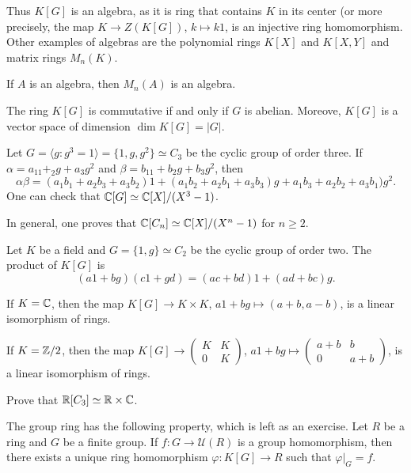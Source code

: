 Thus $K[G]$ is an algebra, as it is ring that contains $K$ in its center (or more precisely,
the map $K\to Z(K[G])$, $k\mapsto k1$, is an injective ring homomorphism.  
Other examples of algebras 
are the polynomial rings $K[X]$ and $K[X,Y]$ and matrix rings $M_n(K)$.  

\begin{example}
	If $A$ is an algebra, then $M_n(A)$ is an algebra.	
\end{example}

The ring $K[G]$ is commutative if and only if $G$ is abelian. Moreove,
$K[G]$ is a vector space of dimension $\dim K[G]=|G|$.

\begin{example}
	Let $G=\langle g:g^3=1\rangle=\{1,g,g^2\}\simeq C_3$ be the cyclic group of order three. 
	If $\alpha=a_11+_2g+a_3g^2$ and $\beta=b_11+b_2g+b_3g^2$, then
	\[
		\alpha\beta=(a_1b_1+a_2b_3+a_3b_2)1+(a_1b_2+a_2b_1+a_3b_3)g+a_1b_3+a_2b_2+a_3b_1)g^2.
	\]
	One can check that $\mathbb{C}[G]\simeq\mathbb{C}[X]/(X^3-1)$. 
\end{example}

In general, one proves that $\mathbb{C}[C_n]\simeq\mathbb{C}[X]/(X^n-1)$ for $n\geq2$.

\begin{example}
	Let $K$ be a field and 
	$G=\{1,g\}\simeq C_2$ be the cyclic group of order two. The product
	of $K[G]$ is 
	\[
	(a1+bg)(c1+gd)=(ac+bd)1+(ad+bc)g.
	\]
	
	If $K=\mathbb{C}$, then the map $K[G]\to K\times K$, $a1+bg\mapsto (a+b,a-b)$, 
	is a linear isomorphism of rings. 
	
	If $K=\mathbb{Z}/2$, then the map $K[G]\to\begin{pmatrix}
		K&K\\
		0&K
	\end{pmatrix}$, $a1+bg\mapsto\begin{pmatrix}
		a+b&b\\
		0&a+b		
	\end{pmatrix}$, is a linear isomorphism of rings. 
\end{example}

\begin{exercise}
	Prove that $\mathbb{R}[C_3]\simeq\mathbb{R}\times\mathbb{C}$. 	
\end{exercise}

The group ring has the following property, which is left as an exercise. 
Let $R$ be a ring and
$G$ be a finite group. If $f\colon G\to\mathcal{U}(R)$ is a group homomorphism, 
then there exists a unique ring homomorphism $\varphi\colon K[G]\to R$ such that
$\varphi|_G=f$. 

